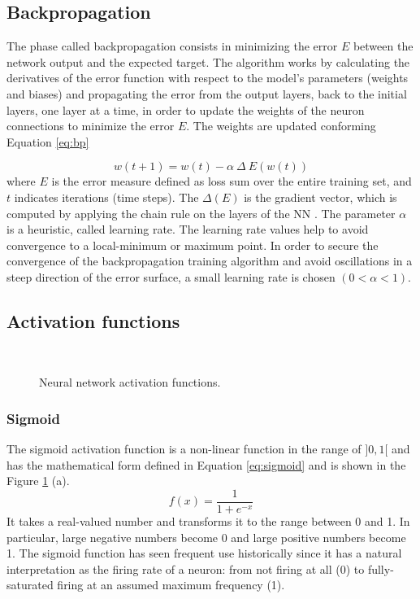 \subsection{Backpropagation}
The phase called backpropagation consists in minimizing the error $E$ between the network output and the expected target. The algorithm works by calculating the derivatives of the error
function with respect to the model’s parameters (weights and biases) and propagating the
error from the output layers, back to the initial layers, one layer at a time, in order to update the weights of the neuron connections to minimize the error $E$. The weights are updated conforming Equation \ref{eq:bp}

\begin{equation}
w(t+1) = w(t) - \alpha\ \Delta\ E(w(t))
\label{eq:bp}
\end{equation}
where $E$ is the error measure defined as loss sum over the entire training set, and $t$ indicates iterations (time steps). The $\Delta(E)$ is the gradient vector, which is computed by applying the chain rule on the layers of the NN \cite{rumelhart1985learning}. The parameter $\alpha$ is a heuristic, called learning rate. The learning rate values help to avoid convergence to a local-minimum or maximum point. In order to secure the convergence of the backpropagation training algorithm and avoid oscillations in a steep direction of the error surface, a small learning rate is chosen $(0 < \alpha < 1)$.

\subsection{Activation functions}
\begin{figure}[!htb]
\centering
\hspace*{0.2in} %
\\
\hspace*{0.2in} %


\caption{Neural network activation functions. } \label{fig:activation}
\end{figure}
\subsubsection{Sigmoid}
The sigmoid activation function is a non-linear function in the range of $]0, 1[$ and has the mathematical form defined in Equation \ref{eq:sigmoid} and is shown in the Figure \ref{fig:activation} (a).
\begin{equation}
f(x) = \frac{1}{1+e^{-x}}
\label{eq:sigmoid}
\end{equation}
It takes a real-valued number and transforms it to the range between 0 and 1. In particular, large negative numbers become 0 and large positive numbers become 1. The sigmoid function has seen frequent use historically since it has a natural interpretation as the firing rate of a neuron: from not firing at all (0) to fully-saturated firing at an assumed maximum frequency (1). 

